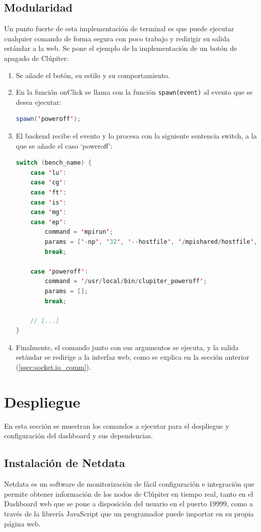 \subsection{Modularidad}
Un punto fuerte de esta implementación de terminal es que puede ejecutar cualquier comando de forma segura con poco trabajo y redirigir su salida estándar a la web. Se pone el ejemplo de la implementación de un botón de apagado de Clúpiter:

\begin{enumerate}
  \item Se añade el botón, su estilo y su comportamiento.
  \item En la función onClick se llama con la función \texttt{spawn(event)} al evento que se desea ejecutar:
\begin{lstlisting}[language=java]
spawn('poweroff');
\end{lstlisting}
  \item El backend recibe el evento y lo procesa con la siguiente sentencia switch, a la que se añade el caso `poweroff':
\begin{lstlisting}[language=java]
switch (bench_name) {
    case 'lu':
    case 'cg':
    case 'ft':
    case 'is':
    case 'mg':
    case 'ep':
        command = 'mpirun';
        params = ['-np', '32', '--hostfile', '/mpishared/hostfile', '--mca', 'opal_warn_on_missing_libcuda', '0', `/mpishared/NPB3.4.2/NPB3.4-MPI/bin/${bench_name}.*.x`];
        break;

    case 'poweroff':
        command = '/usr/local/bin/clupiter_poweroff';
        params = [];
        break;
    
    // [...]
}
\end{lstlisting}
  \item Finalmente, el comando junto con sus argumentos se ejecuta, y la salida estándar se redirige a la interfaz web, como se explica en la sección anterior (\ref{ssec:socket.io_comm}).
\end{enumerate}

\section{Despliegue}
En esta sección se muestran los comandos a ejecutar para el despliegue y configuración del dashboard y sus dependencias.

\subsection{Instalación de Netdata}
Netdata es un software de monitorización de fácil configuración e integración que permite obtener información de los nodos de Clúpiter en tiempo real, tanto en el Dashboard web que se pone a disposición del usuario en el puerto 19999, como a través de la librería JavaScript que un programador puede importar en su propia página web.

